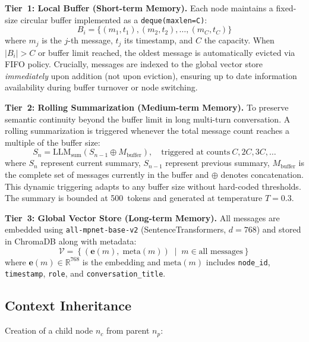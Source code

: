 \textbf{Tier~1: Local Buffer (Short-term Memory).}
Each node maintains a fixed-size circular buffer implemented as a \texttt{deque(maxlen=C)}:
\begin{equation}
B_i = \{(m_1, t_1), (m_2, t_2), \ldots, (m_C, t_C)\}
\label{eq:buffer}
\end{equation}
where $m_j$ is the $j$-th message, $t_j$ its timestamp, and $C$ the capacity. When $|B_i| > C$ or buffer limit reached, the oldest message is automatically evicted via FIFO policy. Crucially, messages are indexed to the global vector store \emph{immediately} upon addition (not upon eviction), ensuring up to date information availability during buffer turnover or node switching.

\textbf{Tier~2: Rolling Summarization (Medium-term Memory).}
To preserve semantic continuity beyond the buffer limit in long multi-turn conversation. A rolling summarization is triggered whenever the total message count reaches a multiple of the buffer size:
\begin{equation}
S_{n} = \text{LLM}_{\text{sum}}\!\left(S_{n-1} \oplus M_{\text{buffer}}\right), \quad \text{triggered at counts}\ C, 2C, 3C, \ldots
\label{eq:summary}
\end{equation}
where $S_n$ represent current summary, $S_{n-1}$ represent previous summary, $M_{\text{buffer}}$ is the complete set of messages currently in the buffer and $\oplus$ denotes concatenation. This dynamic triggering adapts to any buffer size without hard-coded thresholds. The summary is bounded at 500~tokens and generated at temperature $T{=}0.3$.

\textbf{Tier~3: Global Vector Store (Long-term Memory).}
All messages are embedded using \texttt{all-mpnet-base-v2} (SentenceTransformers, $d{=}768$) and stored in ChromaDB along with metadata:
\begin{equation}
\mathcal{V} = \left\{\left(\mathbf{e}(m),\; \text{meta}(m)\right) \;\middle|\; m \in \text{all messages}\right\}
\label{eq:vectorstore}
\end{equation}
where $\mathbf{e}(m) \in \mathbb{R}^{768}$ is the embedding and $\text{meta}(m)$ includes \texttt{node\_id}, \texttt{timestamp}, \texttt{role}, and \texttt{conversation\_title}. 

\subsection{Context Inheritance}\label{subsubsec:inheritance}

Creation of a child node $n_c$ from parent $n_p$:

